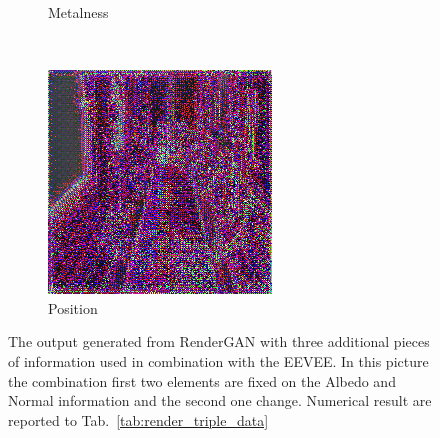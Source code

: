 \begin{figure}[h!]
\begin{subfigure}[b]{0.175\textwidth}
     \caption{Metalness}
    \end{subfigure}
    ~
    \begin{subfigure}[b]{0.175\textwidth}
     \includegraphics[width=\textwidth]{figures/result/triple/albedo_normal_position/2.png}
     \caption{Position}
    \end{subfigure}
    \caption[Generation Result with fixed input on Albedo and Normal]{The output generated from RenderGAN with three additional pieces of information used in combination with the EEVEE. In this picture the combination first two elements are fixed on the Albedo and Normal information and the second one change. Numerical result are reported to Tab.~\ref{tab:render_triple_data}}
    \label{fig:triple_input_base_albedo_normal}
\end{figure}

